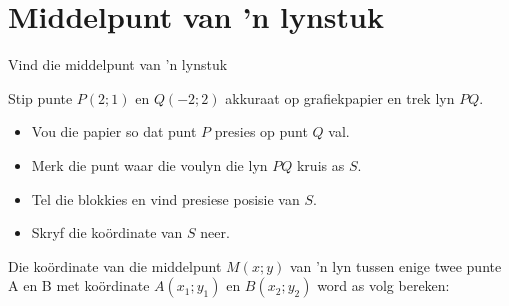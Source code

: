 %     
%     
%     

\section{Middelpunt van ’n lynstuk}
\begin{Investigation}{Vind die middelpunt van 'n lynstuk}
\item Stip punte $P(2;1)$ en $Q(-2;2)$ akkuraat op grafiekpapier en trek lyn $PQ$.
\begin{itemize}
 \item Vou die papier so dat punt $P$ presies op punt $Q$ val.
\item Merk die punt waar die voulyn die lyn $PQ$ kruis as $S$.
\item Tel die blokkies en vind presiese posisie van $S$.
\item Skryf die ko\"ordinate van $S$ neer.
\end{itemize}

\end{Investigation}
Die koördinate van die middelpunt $M(x;y)$ van ’n lyn tussen enige twee punte A en B met koördinate $A(x_1;y_1)$ en $B(x_2;y_2)$ word as volg bereken:


